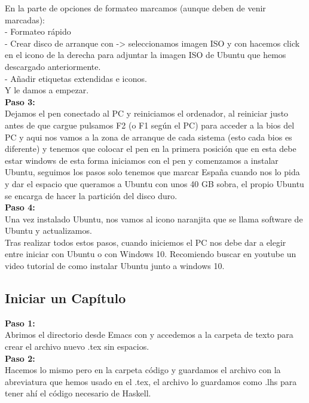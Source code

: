 En la parte de opciones de formateo marcamos (aunque deben de venir marcadas):\\

- Formateo rápido\\

- Crear disco de arranque con -> seleccionamos imagen ISO y con hacemos click en el icono de la derecha para adjuntar la imagen ISO de Ubuntu que hemos descargado anteriormente.\\

- Añadir etiquetas extendidas e iconos.\\

Y le damos a empezar.\\


\textbf{Paso 3:}\\
Dejamos el pen conectado al PC y reiniciamos el ordenador, al reiniciar justo antes de que cargue pulsamos F2 (o F1 según el PC) para acceder a la bios del PC y aqui nos vamos a la zona de arranque de cada sistema (esto cada bios es diferente) y tenemos que colocar el pen en la primera posición que en esta debe estar windows de esta forma iniciamos con el pen y comenzamos a instalar Ubuntu, seguimos los pasos solo tenemos que marcar España cuando nos lo pida y dar el espacio que queramos a Ubuntu con unos 40 GB sobra, el propio Ubuntu se encarga de hacer la partición del disco duro.\\

\textbf{Paso 4:}\\
Una vez instalado Ubuntu, nos vamos al icono naranjita que se llama software de Ubuntu y actualizamos.\\

Tras realizar todos estos pasos, cuando iniciemos el PC nos debe dar a elegir entre iniciar con Ubuntu o con Windows 10. Recomiendo buscar en youtube un video tutorial de como instalar Ubuntu junto a windows 10.\\


\subsection{Iniciar un Capítulo}

\textbf{Paso 1:}\\
Abrimos el directorio desde Emacs con  y accedemos a la carpeta de texto para crear el archivo nuevo .tex sin espacios.\\

\textbf{Paso 2:}\\
Hacemos lo mismo pero en la carpeta código y guardamos el archivo con la abreviatura que hemos usado en el .tex, el archivo lo guardamos como .lhs para tener ahí el código necesario de Haskell. \\

